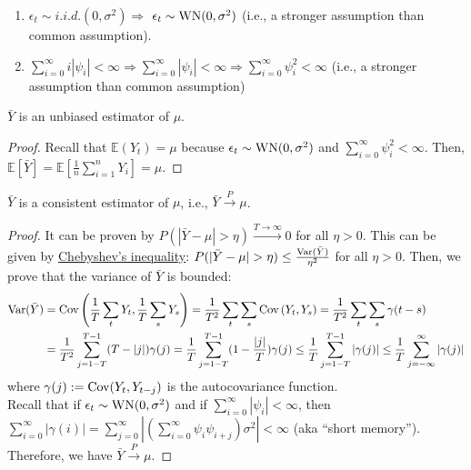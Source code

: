 \documentclass[11pt]{elegantbook}
\begin{document}
\begin{note}
    \begin{enumerate}
        \item $\epsilon_t\sim i.i.d.(0,\sigma^2) \Rightarrow $ $\epsilon_t\sim \textnormal{WN}(0,\sigma^2)$ (i.e., a stronger assumption than common assumption).
        \item $\sum_{i=0}^\infty i|\psi_i|<\infty \Rightarrow \sum_{i=0}^\infty |\psi_i|<\infty \Rightarrow \sum_{i=0}^\infty \psi_i^2<\infty$ (i.e., a stronger assumption than common assumption)
    \end{enumerate}
\end{note}
\begin{lemma}[Unbiasedness]
    $\bar{Y}$ is an unbiased estimator of $\mu$.
\end{lemma}
\begin{proof}
    Recall that $\mathbb{E}(Y_t)=\mu$ because $\epsilon_t\sim \textnormal{WN}(0,\sigma^2)$ and $\sum_{i=0}^\infty \psi_i^2<\infty$. Then, $\mathbb{E}[\bar{Y}]=\mathbb{E}[\frac{1}{n}\sum_{i=1}^n Y_i]=\mu$.
\end{proof}
\begin{lemma}[Consistency]
    $\bar{Y}$ is a consistent estimator of $\mu$, i.e., $\bar{Y}\stackrel{P}{\longrightarrow}\mu$.
\end{lemma}
\begin{proof}
    It can be proven by $P(|\bar{Y}-\mu|>\eta)\stackrel{T \rightarrow \infty}{\longrightarrow} 0$ for all $\eta>0$. This can be given by \underline{Chebyshev's inequality}: $P(|\bar{Y}-\mu|>\eta)\leq \frac{\textnormal{Var}(\bar{Y})}{\eta^2}$ for all $\eta>0$. Then, we prove that the variance of $\bar{Y}$ is bounded:
    \begin{equation}
        \begin{aligned}
            \textnormal{Var}(\bar{Y})&=\textnormal{Cov}\left(\frac{1}{T}\sum_{t}Y_t, \frac{1}{T}\sum_{s}Y_s\right)=\frac{1}{T^2}\sum_{t}\sum_{s}\textnormal{Cov}\left(Y_t,Y_s\right)=\frac{1}{T^2}\sum_{t}\sum_{s}\gamma(t-s)\\
            &=\frac{1}{T^2}\sum_{j=1-T}^{T-1}(T-|j|)\gamma(j)=\frac{1}{T}\sum_{j=1-T}^{T-1}(1-\frac{|j|}{T})\gamma(j)\leq \frac{1}{T}\sum_{j=1-T}^{T-1} |\gamma(j)|\leq\frac{1}{T}\sum_{j=-\infty}^\infty |\gamma(j)|
        \end{aligned}
        \nonumber
    \end{equation}
    where $\gamma(j):=\textnormal{Cov}(Y_t,Y_{t-j})$ is the autocovariance function.\\
    Recall that if $\epsilon_t\sim \textnormal{WN}(0,\sigma^2)$ and if $\sum_{i=0}^\infty|\psi_i|<\infty$, then $\sum_{i=0}^\infty |\gamma(i)|=\sum_{j=0}^\infty|(\sum_{i=0}^{\infty}\psi_i\psi_{i+j})\sigma^2|<\infty$ (aka ``short memory''). Therefore, we have $\bar{Y}\stackrel{P}{\longrightarrow}\mu$.
\end{proof}
\end{document}
